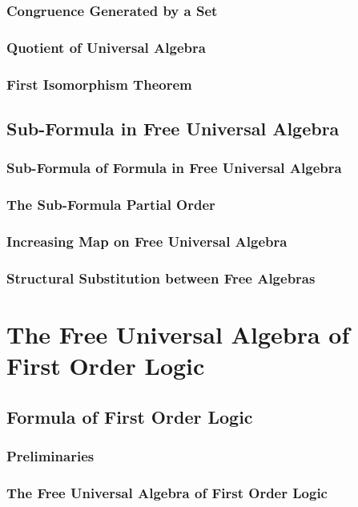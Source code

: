 \documentclass{report}
\begin{document}
    \subsection{Congruence Generated by a Set}
    \subsection{Quotient of Universal Algebra}
    \subsection{First Isomorphism Theorem}
\section{Sub-Formula in Free Universal Algebra}
    \subsection{Sub-Formula of Formula in Free Universal Algebra}
    \subsection{The Sub-Formula Partial Order}
    \subsection{Increasing Map on Free Universal Algebra}
    \subsection{Structural Substitution between Free Algebras}
\chapter{The Free Universal Algebra of First Order Logic}
\section{Formula of First Order Logic}
    \subsection{Preliminaries}
    \subsection{The Free Universal Algebra of First Order Logic}
\end{document}
